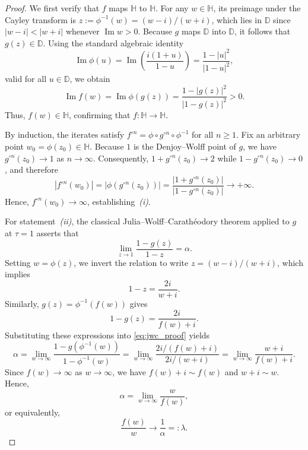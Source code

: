 \documentclass[12pt]{amsart}
\numberwithin{equation}{section}
\theoremstyle{plain}
\theoremstyle{definition}
\begin{document}
\begin{proof}
We first verify that $f$ maps $\mathbb{H}$ to $\mathbb{H}$. For any
$w\in\mathbb{H}$, its preimage under the Cayley transform is
$z:=\phi^{-1}(w)=(w-i)/(w+i)$, which lies in $\mathbb{D}$ since
$|w-i|<|w+i|$ whenever $\operatorname{Im}w>0$. Because $g$ maps
$\mathbb{D}$ into $\mathbb{D}$, it follows that $g(z)\in\mathbb{D}$.
Using the standard algebraic identity
\begin{equation*}
\operatorname{Im}\phi(u)
=
\operatorname{Im}\!\left(\frac{i(1+u)}{1-u}\right)
=
\frac{1-|u|^2}{|1-u|^2},
\end{equation*}
valid for all $u\in\mathbb{D}$, we obtain
\begin{equation*}
\operatorname{Im}f(w)
=
\operatorname{Im}\phi(g(z))
=
\frac{1-|g(z)|^2}{|1-g(z)|^2}
>0.
\end{equation*}
Thus, $f(w)\in\mathbb{H}$, confirming that
$f:\mathbb{H}\to\mathbb{H}$.

By induction, the iterates satisfy
$f^{\circ n}=\phi\circ g^{\circ n}\circ\phi^{-1}$ for all $n\ge1$.
Fix an arbitrary point $w_0=\phi(z_0)\in\mathbb{H}$.
Because $1$ is the Denjoy--Wolff point of $g$, we have
$g^{\circ n}(z_0)\to1$ as $n\to\infty$. Consequently,
$1+g^{\circ n}(z_0)\to2$ while
$1-g^{\circ n}(z_0)\to0$, and therefore
\begin{equation*}
|f^{\circ n}(w_0)|
=
|\phi(g^{\circ n}(z_0))|
=
\frac{|1+g^{\circ n}(z_0)|}
{|1-g^{\circ n}(z_0)|}
\longrightarrow+\infty.
\end{equation*}
Hence,
$f^{\circ n}(w_0)\to\infty$,
establishing~\emph{(i)}.

For statement~\emph{(ii)}, the classical
Julia--Wolff--Carath\'eodory theorem applied to $g$ at $\tau=1$
asserts that
\begin{equation}
\label{eq:jwc_proof}
\lim_{z\to1}
\frac{1-g(z)}{1-z}
=
\alpha.
\end{equation}
Setting $w=\phi(z)$, we invert the relation to write
$z=(w-i)/(w+i)$, which implies
\begin{equation*}
1-z=\frac{2i}{w+i}.
\end{equation*}
Similarly, $g(z)=\phi^{-1}(f(w))$
gives
\begin{equation*}
1-g(z)=\frac{2i}{f(w)+i}.
\end{equation*}
Substituting these expressions into
\eqref{eq:jwc_proof} yields
\begin{equation*}
\alpha
=
\lim_{w\to\infty}
\frac{1-g(\phi^{-1}(w))}
{1-\phi^{-1}(w)}
=
\lim_{w\to\infty}
\frac{2i/(f(w)+i)}
{2i/(w+i)}
=
\lim_{w\to\infty}
\frac{w+i}{f(w)+i}.
\end{equation*}
Since $f(w)\to\infty$ as $w\to\infty$, we have
$f(w)+i\sim f(w)$ and
$w+i\sim w$. Hence,
\begin{equation*}
\alpha
=
\lim_{w\to\infty}
\frac{w}{f(w)},
\end{equation*}
or equivalently,
\begin{equation*}
\frac{f(w)}{w}\longrightarrow\frac1\alpha=:\lambda.
\end{equation*}


\end{proof}
\end{document}
